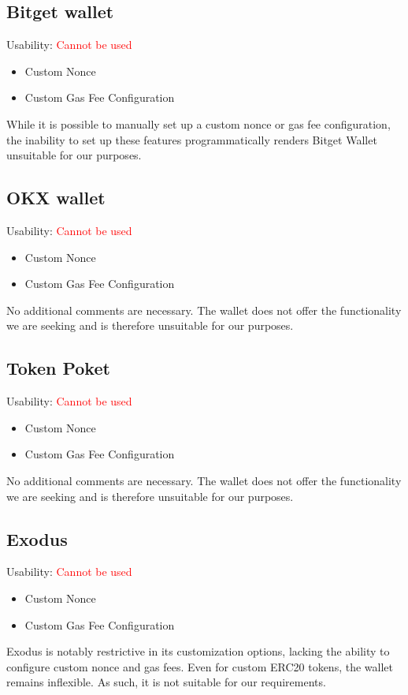 \documentclass[fleqn,10pt]{olplainarticle}
\newcommand{\cmark}{\ding{51}}%
\newcommand{\xmark}{\ding{55}}%
\begin{document}
\subsection{Bitget wallet}
Usability: \textcolor{red}{Cannot be used}
\begin{itemize}[noitemsep, nolistsep]
	\item [\textcolor{green}{\cmark}] Custom Nonce
	\item [\textcolor{green}{\cmark}] Custom Gas Fee Configuration
\end{itemize}
While it is possible to manually set up a custom nonce or gas fee configuration, the inability to set up these features programmatically renders Bitget Wallet unsuitable for our purposes.

\subsection{OKX wallet}
Usability: \textcolor{red}{Cannot be used}
\begin{itemize}[noitemsep, nolistsep]
	\item [\textcolor{red}{\xmark}] Custom Nonce
	\item [\textcolor{red}{\xmark}] Custom Gas Fee Configuration
\end{itemize}
No additional comments are necessary. The wallet does not offer the functionality we are seeking and is therefore unsuitable for our purposes.

\subsection{Token Poket}
Usability: \textcolor{red}{Cannot be used}
\begin{itemize}[noitemsep, nolistsep]
	\item [\textcolor{red}{\xmark}] Custom Nonce
	\item [\textcolor{red}{\xmark}] Custom Gas Fee Configuration
\end{itemize}
No additional comments are necessary. The wallet does not offer the functionality we are seeking and is therefore unsuitable for our purposes.

\subsection{Exodus}
Usability: \textcolor{red}{Cannot be used}
\begin{itemize}[noitemsep, nolistsep]
	\item [\textcolor{red}{\xmark}] Custom Nonce
	\item [\textcolor{red}{\xmark}] Custom Gas Fee Configuration
\end{itemize}
Exodus is notably restrictive in its customization options, lacking the ability to configure custom nonce and gas fees. Even for custom ERC20 tokens, the wallet remains inflexible. As such, it is not suitable for our requirements.
\end{document}

